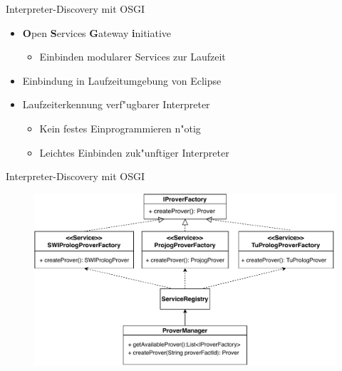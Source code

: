 \documentclass[18pt]{beamer}
\begin{document}
\begin{frame}{Interpreter-Discovery mit OSGI}
\begin{itemize}
\item \textbf{O}pen \textbf{S}ervices \textbf{G}ateway \textbf{i}nitiative
\begin{itemize}
\item Einbinden modularer Services zur Laufzeit
\end{itemize}
\vspace{0.1cm}
\item Einbindung in Laufzeitumgebung von Eclipse
\vspace{0.1cm}
\item Laufzeiterkennung verf"ugbarer Interpreter
\begin{itemize}
\item Kein festes Einprogrammieren n"otig
\item Leichtes Einbinden zuk"unftiger Interpreter
\end{itemize}
\end{itemize}
\end{frame}
\begin{frame}{Interpreter-Discovery mit OSGI}
\begin{figure}[h]
\centering
\includegraphics[width=1\textwidth]{osgi.pdf}
\end{figure}
\end{frame}
\end{document}
